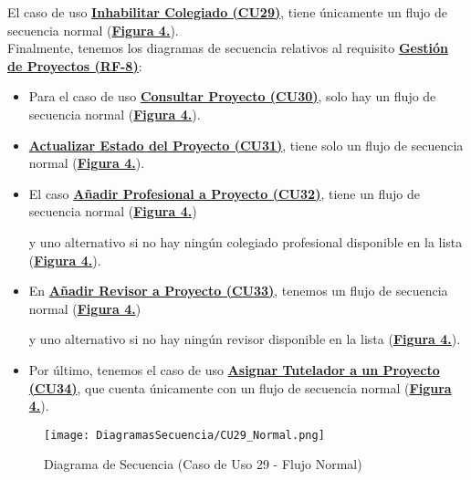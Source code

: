 \addtocounter{figura_cap4}{1}
El caso de uso \textbf{\hyperref[tab:curInhabilitar]{Inhabilitar Colegiado (CU29)}}, tiene únicamente un flujo de secuencia normal (\textbf{\hyperref[fig:Secuencia_CU29_Normal]{Figura 4.}}). \\

Finalmente, tenemos los diagramas de secuencia relativos al requisito \textbf{\hyperref[tab:rfGestProyectos]{Gestión de Proyectos (RF-8)}}:
\begin{itemize}
  \item \addtocounter{figura_cap4}{1} Para el caso de uso \textbf{\hyperref[tab:curConsultarProyectos]{Consultar Proyecto (CU30)}}, solo hay un flujo de secuencia normal (\textbf{\hyperref[fig:Secuencia_CU30_Normal]{Figura 4.}}).
  \item \addtocounter{figura_cap4}{1} \textbf{\hyperref[tab:curActualizarProyecto]{Actualizar Estado del Proyecto (CU31)}}, tiene solo un flujo de secuencia normal (\textbf{\hyperref[fig:Secuencia_CU31_Normal]{Figura 4.}}).
  \item \addtocounter{figura_cap4}{1} El caso \textbf{\hyperref[tab:curAsignarProfProyecto]{Añadir Profesional a Proyecto (CU32)}}, tiene un flujo de secuencia normal (\textbf{\hyperref[fig:Secuencia_CU32_Normal]{Figura 4.}}) \addtocounter{figura_cap4}{1} y uno alternativo si no hay ningún colegiado profesional disponible en la lista (\textbf{\hyperref[fig:Secuencia_CU32_Alt1]{Figura 4.}}).
  \item \addtocounter{figura_cap4}{1} En \textbf{\hyperref[tab:curAsignarRevisorProyecto]{Añadir Revisor a Proyecto (CU33)}}, tenemos un flujo de secuencia normal (\textbf{\hyperref[fig:Secuencia_CU33_Normal]{Figura 4.}}) \addtocounter{figura_cap4}{1} y uno alternativo si no hay ningún revisor disponible en la lista (\textbf{\hyperref[fig:Secuencia_CU33_Alt1]{Figura 4.}}).
  \item \addtocounter{figura_cap4}{1} Por último, tenemos el caso de uso \textbf{\hyperref[tab:curAsignarTutela]{Asignar Tutelador a un Proyecto (CU34)}}, que cuenta únicamente con un flujo de secuencia normal (\textbf{\hyperref[fig:Secuencia_CU34_Normal]{Figura 4.}}).
\end{itemize}

\begin{landscape}
  \label{fig:Secuencia_CU29_Normal}
  \vspace*{\fill}
  \begin{figure}[!htbp]
    \centering
    \texttt{[image: DiagramasSecuencia/CU29\_Normal.png]}
    \caption{Diagrama de Secuencia (Caso de Uso 29 - Flujo Normal)}
  \end{figure}
  \vfill
\end{landscape}
\FloatBarrier

